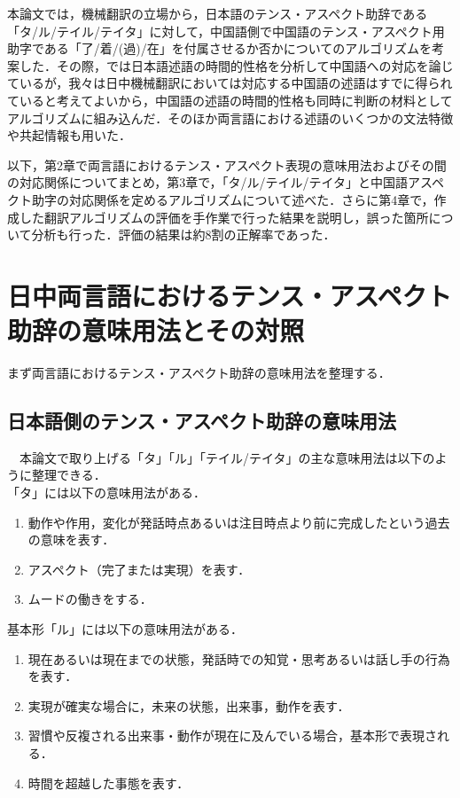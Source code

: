 本論文では，機械翻訳の立場から，日本語のテンス・アスペクト助辞である「タ/ル/テイル/テイタ」に対して，中国語側で中国語のテンス・アスペクト用助字である「了/着/(過)/在」を付属させるか否かについてのアルゴリズムを考案した．その際，では日本語述語の時間的性格を分析して中国語への対応を論じているが，我々は日中機械翻訳においては対応する中国語の述語はすでに得られていると考えてよいから，中国語の述語の時間的性格も同時に判断の材料としてアルゴリズムに組み込んだ．そのほか両言語における述語のいくつかの文法特徴や共起情報も用いた．

以下，第2章で両言語におけるテンス・アスペクト表現の意味用法およびその間の対応関係についてまとめ，第3章で，「タ/ル/テイル/テイタ」と中国語アスペクト助字の対応関係を定めるアルゴリズムについて述べた．さらに第4章で，作成した翻訳アルゴリズムの評価を手作業で行った結果を説明し，誤った箇所について分析も行った．評価の結果は約8割の正解率であった．

\section{日中両言語におけるテンス・アスペクト助辞の意味用法とその対照}
まず両言語におけるテンス・アスペクト助辞の意味用法を整理する．

\subsection{日本語側のテンス・アスペクト助辞の意味用法}
　本論文で取り上げる「タ」「ル」「テイル/テイタ」の主な意味用法は以下のように整理できる\cite{Shu1989,Kanemizu2000,Masuoka1992,Oh1996,Teramura1991}．\\

「タ」には以下の意味用法がある．
\begin{enumerate}
\item 動作や作用，変化が発話時点あるいは注目時点より前に完成したという過去の意味を表す．
\item アスペクト（完了または実現）を表す．
\item ムードの働きをする．\\
\end{enumerate}

基本形「ル」には以下の意味用法がある．
\begin{enumerate}
\item 現在あるいは現在までの状態，発話時での知覚・思考あるいは話し手の行為を表す．
\item 実現が確実な場合に，未来の状態，出来事，動作を表す．
\item 習慣や反複される出来事・動作が現在に及んでいる場合，基本形で表現される．
\item 時間を超越した事態を表す．\\
\end{enumerate}


